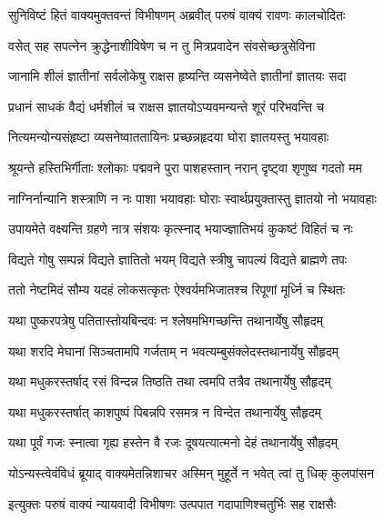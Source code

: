 
\twolineshloka
{सुनिविष्टं हितं वाक्यमुक्तवन्तं विभीषणम्}
{अब्रवीत् परुषं वाक्यं रावणः कालचोदितः} %

\twolineshloka
{वसेत् सह सपत्नेन क्रुद्धेनाशीविषेण च}
{न तु मित्रप्रवादेन संवसेच्छत्रुसेविना} %

\twolineshloka
{जानामि शीलं ज्ञातीनां सर्वलोकेषु राक्षस}
{हृष्यन्ति व्यसनेष्वेते ज्ञातीनां ज्ञातयः सदा} %

\twolineshloka
{प्रधानं साधकं वैद्यं धर्मशीलं च राक्षस}
{ज्ञातयोऽप्यवमन्यन्ते शूरं परिभवन्ति च} %

\twolineshloka
{नित्यमन्योन्यसंहृष्टा व्यसनेष्वाततायिनः}
{प्रच्छन्नहृदया घोरा ज्ञातयस्तु भयावहाः} %

\twolineshloka
{श्रूयन्ते हस्तिभिर्गीताः श्लोकाः पद्मवने पुरा}
{पाशहस्तान् नरान् दृष्ट्वा शृणुष्व गदतो मम} %

\twolineshloka
{नाग्निर्नान्यानि शस्त्राणि न नः पाशा भयावहाः}
{घोराः स्वार्थप्रयुक्तास्तु ज्ञातयो नो भयावहाः} %

\twolineshloka
{उपायमेते वक्ष्यन्ति ग्रहणे नात्र संशयः}
{कृत्स्नाद् भयाज्ज्ञातिभयं कुकष्टं विहितं च नः} %

\twolineshloka
{विद्यते गोषु सम्पन्नं विद्यते ज्ञातितो भयम्}
{विद्यते स्त्रीषु चापल्यं विद्यते ब्राह्मणे तपः} %

\twolineshloka
{ततो नेष्टमिदं सौम्य यदहं लोकसत्कृतः}
{ऐश्वर्यमभिजातश्च रिपूणां मूर्ध्नि च स्थितः} %

\twolineshloka
{यथा पुष्करपत्रेषु पतितास्तोयबिन्दवः}
{न श्लेषमभिगच्छन्ति तथानार्येषु सौहृदम्} %

\twolineshloka
{यथा शरदि मेघानां सिञ्चतामपि गर्जताम्}
{न भवत्यम्बुसंक्लेदस्तथानार्येषु सौहृदम्} %

\twolineshloka
{यथा मधुकरस्तर्षाद् रसं विन्दन्न तिष्ठति}
{तथा त्वमपि तत्रैव तथानार्येषु सौहृदम्} %

\twolineshloka
{यथा मधुकरस्तर्षात् काशपुष्पं पिबन्नपि}
{रसमत्र न विन्देत तथानार्येषु सौहृदम्} %

\twolineshloka
{यथा पूर्वं गजः स्नात्वा गृह्य हस्तेन वै रजः}
{दूषयत्यात्मनो देहं तथानार्येषु सौहृदम्} %

\twolineshloka
{योऽन्यस्त्वेवंविधं ब्रूयाद् वाक्यमेतन्निशाचर}
{अस्मिन् मुहूर्ते न भवेत् त्वां तु धिक् कुलपांसन} %

\twolineshloka
{इत्युक्तः परुषं वाक्यं न्यायवादी विभीषणः}
{उत्पपात गदापाणिश्चतुर्भिः सह राक्षसैः} %

